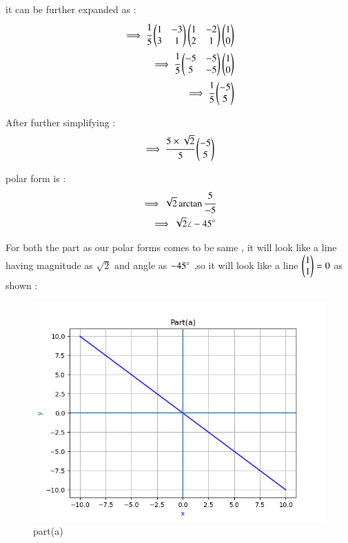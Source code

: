 \begin{enumerate}[label=\thesection.\arabic*.,ref=\thesection.\theenumi]
\begin{enumerate}
it can be further expanded as :
\begin{align}
    \implies \cfrac{1}{5}\begin{pmatrix}1 & -3\\3 & 1\end{pmatrix}\begin{pmatrix}1 & -2\\2 & 1\end{pmatrix}\begin{pmatrix}1 \\ 0\end{pmatrix}
\\
    \implies \cfrac{1}{5}\begin{pmatrix}-5 & -5\\5 & -5\end{pmatrix}\begin{pmatrix}1 \\ 0\end{pmatrix}
\\
    \implies \cfrac{1}{5}\begin{pmatrix}-5 \\ 5\end{pmatrix}
\end{align}

After further simplifying :
\begin{align}
    \implies \cfrac{5 \times \sqrt{2}}{5}\begin{pmatrix}-5 \\ 5\end{pmatrix}
\end{align}

polar form is :
\begin{align}
    \implies \sqrt{2}\arctan\cfrac{5}{-5}
\\
    \implies \sqrt{2} \angle -45 \degree
\end{align}

For both the part as our polar forms comes to be same , it will look like a line having magnitude as $\sqrt{2}$ and angle as $-45\degree$
,so it will look like a line $\begin{pmatrix}1 \\ 1\end{pmatrix}=0$ as shown :

\renewcommand{\thefigure}{\theenumi.\arabic{figure}}
\begin{figure}[!ht]
    \centering
    \includegraphics[width=\columnwidth]{./figures/MT_A1_a}
\caption{part(a)}
\label{fig: part(a)}
\end{figure}

\end{enumerate}

\end{enumerate}


